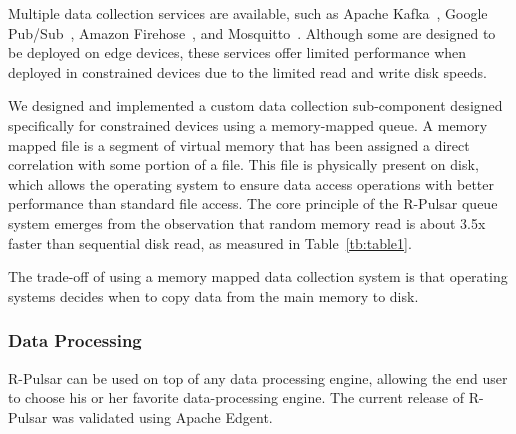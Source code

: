Multiple data collection services are available, such as Apache Kafka~\cite{kafka}, Google Pub/Sub~\cite{google}, Amazon Firehose~\cite{amazon}, and Mosquitto~\cite{mosquitto}. Although some are designed to be deployed on edge devices, these services offer limited performance when deployed in constrained devices due to the limited read and write disk speeds.

We designed and implemented a custom data collection sub-component designed specifically for constrained devices using a memory-mapped queue. A memory mapped file is a segment of virtual memory that has been assigned a direct correlation with some portion of a file. This file is physically present on disk, which allows the operating system to ensure data access operations with better performance than standard file access. The core principle of the R-Pulsar queue system emerges from the observation that random memory read is about 3.5x faster than sequential disk read, as measured in Table~\ref{tb:table1}. 

The trade-off of using a memory mapped data collection system is that operating systems decides when to copy data from the main memory to disk.  
\\
\begin{table}[h!]
\centering
\caption{Measurements of Disk I/O vs RAM memory performance on a Raspberry Pi.} \label{tb:table1}
\end{table}

\subsubsection{Data Processing }

R-Pulsar can be used on top of any data processing engine, allowing the end user to choose his or her favorite data-processing engine. The current release of R-Pulsar was validated using Apache Edgent. 

